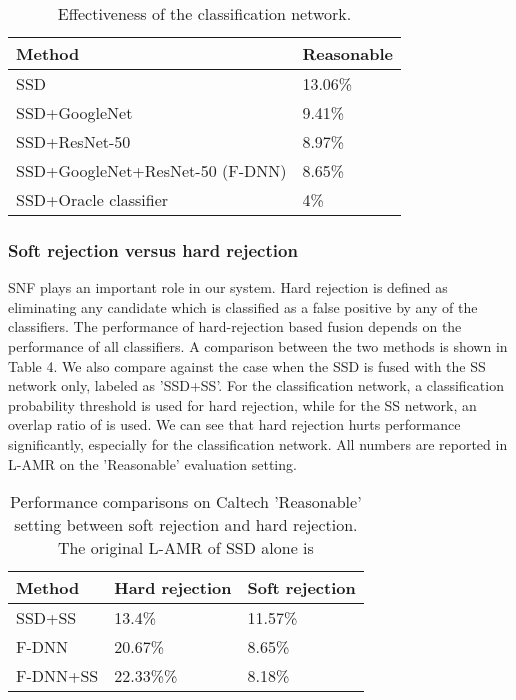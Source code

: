 \documentclass[10pt,letterpaper]{article}
\begin{document}
\begin{table}[h!]
\begin{center}
\begin{tabular}{|l|l|}
\hline
Method & Reasonable\\
\hline\hline
SSD & 13.06\%\\
SSD+GoogleNet & 9.41\%\\
SSD+ResNet-50 & 8.97\%\\
SSD+GoogleNet+ResNet-50 (F-DNN)& 8.65\%\\
SSD+Oracle classifier & 4\%\\
\hline
\end{tabular}
\end{center}
\caption{Effectiveness of the classification network.}
\end{table}


\subsubsection{Soft rejection versus hard rejection}
SNF plays an important role in our system. Hard rejection is defined as eliminating any candidate which is classified as a false positive by any of the classifiers. The performance of hard-rejection based fusion depends on the performance of all classifiers. A comparison between the two methods is shown in Table 4. We also compare against the case when the SSD is fused with the SS network only, labeled as 'SSD+SS'. For the classification network, a  classification probability threshold is used for hard rejection, while for the SS network, an overlap ratio of  is used. 
We can see that hard rejection hurts performance significantly, especially for the classification network. All numbers are reported in L-AMR on the 'Reasonable' evaluation setting.

\begin{table}[h!]
\begin{center}
\begin{tabular}{|l|l|l|}
\hline
Method & Hard rejection & Soft rejection\\
\hline\hline
SSD+SS & 13.4\% & 11.57\%\\
F-DNN & 20.67\% & 8.65\%\\
F-DNN+SS & 22.33\%\% & 8.18\%\\
\hline
\end{tabular}
\end{center}
\caption{Performance comparisons on Caltech 'Reasonable' setting between soft rejection and hard rejection. The original L-AMR of SSD alone is }
\end{table}
\end{document}
